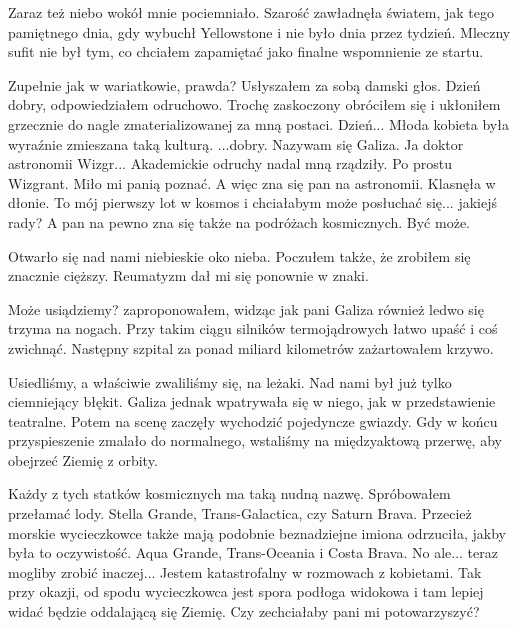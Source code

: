 Zaraz też niebo wokół mnie pociemniało.
Szarość zawładnęła światem, jak tego pamiętnego dnia, gdy wybuchł Yellowstone i nie było dnia przez tydzień.
Mleczny sufit nie był tym, co chciałem zapamiętać jako finalne wspomnienie ze startu.

\begin{dialogue}
	\ds{} Zupełnie jak w wariatkowie, prawda? \dm{} Usłyszałem za sobą damski głos.
	\ds{} Dzień dobry,  \dm{} odpowiedziałem odruchowo. Trochę zaskoczony obróciłem się i ukłoniłem grzecznie do nagle zmaterializowanej za mną postaci.
	\ds{} Dzień... \dm{} Młoda kobieta była wyraźnie zmieszana taką kulturą. \dm{} ...dobry. Nazywam się Galiza.
	\ds{} Ja doktor astronomii Wizgr... \dm{} Akademickie odruchy nadal mną rządziły. \dm{} Po prostu Wizgrant. Miło mi panią poznać.
	\ds{} A więc zna się pan na astronomii. \dm{} Klasnęła w dłonie. \dm{} To mój pierwszy lot w kosmos i chciałabym może posłuchać się... jakiejś rady?
		A pan na pewno zna się także na podróżach kosmicznych.
	\ds{} Być może.
\end{dialogue}

Otwarło się nad nami niebieskie oko nieba.
Poczułem także, że zrobiłem się znacznie cięższy.
Reumatyzm dał mi się ponownie w znaki.

\begin{dialogue}
	\ds{} Może usiądziemy? \dm{} zaproponowałem, widząc jak pani Galiza również ledwo się trzyma na nogach. \dm{} Przy takim ciągu silników termojądrowych łatwo upaść i coś zwichnąć. Następny szpital za ponad miliard kilometrów \dm{} zażartowałem krzywo.
\end{dialogue}

Usiedliśmy, a właściwie zwaliliśmy się, na leżaki.
Nad nami był już tylko ciemniejący błękit.
Galiza jednak wpatrywała się w niego, jak w przedstawienie teatralne.
Potem na scenę zaczęły wychodzić pojedyncze gwiazdy.
Gdy w końcu przyspieszenie zmalało do normalnego, wstaliśmy na międzyaktową przerwę, aby obejrzeć Ziemię z orbity.

\begin{dialogue}
	\ds{} Każdy z tych statków kosmicznych ma taką nudną nazwę. \dm{} Spróbowałem przełamać lody. \dm{} Stella Grande, Trans-Galactica, czy Saturn Brava. 
	\ds{} Przecież morskie wycieczkowce także mają podobnie beznadziejne imiona \dm{} odrzuciła, jakby była to oczywistość. \dm{} Aqua Grande, Trans-Oceania i Costa Brava.
	\ds{} No ale... teraz mogliby zrobić inaczej... \dm{} Jestem katastrofalny w rozmowach z kobietami. \dm{} 
			Tak przy okazji, od spodu wycieczkowca jest spora podłoga widokowa i tam lepiej widać będzie oddalającą się Ziemię. Czy zechciałaby pani mi potowarzyszyć?
\end{dialogue}

